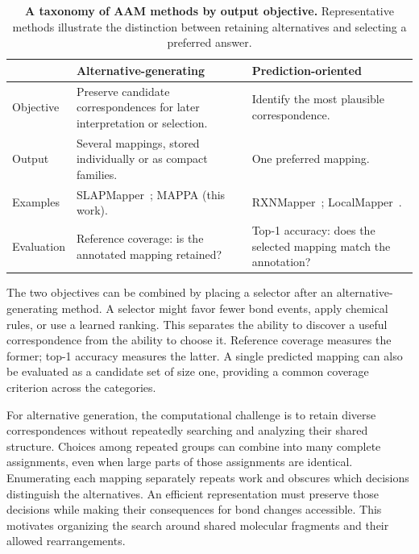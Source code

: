 \begin{table}[!htbp]
\centering\small
\caption{\textbf{A taxonomy of AAM methods by output objective.} Representative methods illustrate the distinction between retaining alternatives and selecting a preferred answer.}
\label{tab:aam-objectives}
\begin{tabular}{@{}>{\raggedright\arraybackslash}p{.18\linewidth}>{\raggedright\arraybackslash}p{.38\linewidth}>{\raggedright\arraybackslash}p{.38\linewidth}@{}}
\toprule
 & \textbf{Alternative-generating} & \textbf{Prediction-oriented}\\
\midrule
Objective & Preserve candidate correspondences for later interpretation or selection. & Identify the most plausible correspondence.\\
Output & Several mappings, stored individually or as compact families. & One preferred mapping.\\
Examples & SLAPMapper~\citep{koda2025}; MAPPA (this work). & RXNMapper~\citep{schwaller2021}; LocalMapper~\citep{chen2024}.\\
Evaluation & Reference coverage: is the annotated mapping retained? & Top-1 accuracy: does the selected mapping match the annotation?\\
\bottomrule
\end{tabular}
\end{table}

The two objectives can be combined by placing a selector after an alternative-generating method. A selector might favor fewer bond events, apply chemical rules, or use a learned ranking. This separates the ability to discover a useful correspondence from the ability to choose it. Reference coverage measures the former; top-1 accuracy measures the latter. A single predicted mapping can also be evaluated as a candidate set of size one, providing a common coverage criterion across the categories.

\begin{samepage}
For alternative generation, the computational challenge is to retain diverse correspondences without repeatedly searching and analyzing their shared structure. Choices among repeated groups can combine into many complete assignments, even when large parts of those assignments are identical. Enumerating each mapping separately repeats work and obscures which decisions distinguish the alternatives. An efficient representation must preserve those decisions while making their consequences for bond changes accessible. This motivates organizing the search around shared molecular fragments and their allowed rearrangements.
\par\end{samepage}

